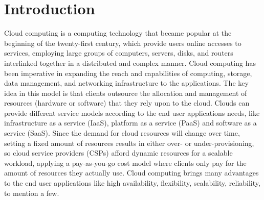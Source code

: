 \section{Introduction}\label{sec:Introduction}
\noindent
Cloud computing is a computing technology that became popular at the beginning of the twenty-first century, which provide users online accesses to services, employing large groups of computers, servers, disks, and routers interlinked together in a distributed and complex manner. Cloud computing has been imperative in expanding the reach and capabilities of computing, storage, data management, and networking infrastructure to the applications. The key idea in this model is that clients outsource the allocation and management of resources (hardware or software) that they rely upon to the cloud. Clouds can provide different service models according to the end user applications needs, like infrastructure as a service (IaaS), platform as a service (PaaS) and software as a service (SaaS). Since the demand for cloud resources will change over time, setting a fixed amount of resources results in either over- or under-provisioning, so cloud service providers (CSPs) afford dynamic resources for a scalable workload, applying a pay-as-you-go cost model where clients only pay for the amount of resources they actually use. Cloud computing brings many advantages to the end user applications like high availability, flexibility, scalability, reliability, to mention a few.\\
